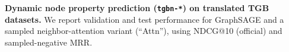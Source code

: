   \begin{table}[!ht]                                                                                                                                                                                                                                         
    \centering                                                                                                                                                                                                                                               
    \caption{{\bf Dynamic node property prediction (\texttt{tgbn-*}) on translated TGB datasets.}                                                                                                                                                            
    We report validation and test performance for GraphSAGE and a sampled neighbor-attention variant (``Attn''), using NDCG@10 (official) and sampled-negative MRR.                                                                                          
    }                                                                                                                                                                                                                                                        
    \label{tab:tgbn_nodeprop_results}                                                                                                                                                                                                                        
    \begingroup                                                                                                                                                                                                                                              
    \scriptsize                                                                                                                                                                                                                                              
    \setlength{\tabcolsep}{2.5pt}                                                                                                                                                                                                                            
    \renewcommand{\arraystretch}{1.1}                                                                                                                                                                                                                        

\end{table}
